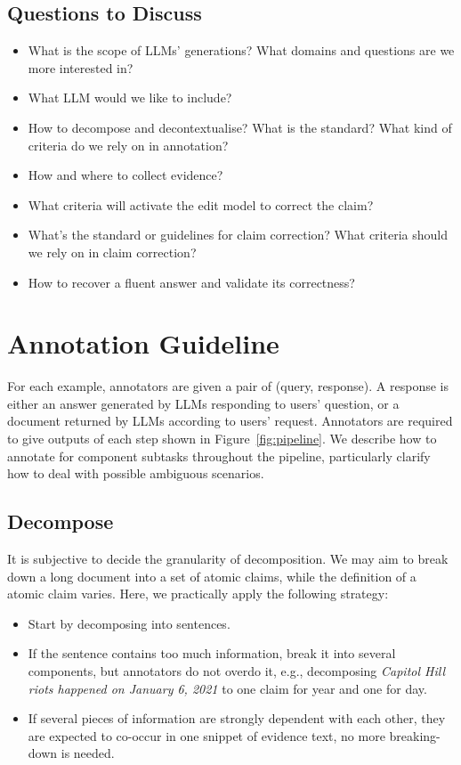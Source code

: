 \documentclass[11pt]{article}
\newcommand{\figref}[1]{Figure~\ref{#1}\xspace}
\begin{document}
\subsection{Questions to Discuss}
\begin{itemize}
    \item What is the scope of LLMs' generations? What domains and questions are we more interested in?
    \item What LLM would we like to include?
    \item How to decompose and decontextualise? What is the standard? What kind of criteria do we rely on in annotation?
    \item How and where to collect evidence?
    \item What criteria will activate the edit model to correct the claim?
    \item What's the standard or guidelines for claim correction? What criteria should we rely on in claim correction?
    \item How to recover a fluent answer and validate its correctness?
\end{itemize}


\section{Annotation Guideline}
For each example, annotators are given a pair of (query, response).
A response is either an answer generated by LLMs responding to users' question, or a document returned by LLMs according to users' request.
Annotators are required to give outputs of each step shown in \figref{fig:pipeline}. 
We describe how to annotate for component subtasks throughout the pipeline, particularly clarify how to deal with possible ambiguous scenarios.

\subsection{Decompose}
It is subjective to decide the granularity of decomposition.
We may aim to break down a long document into a set of atomic claims, while the definition of a atomic claim varies.
Here, we practically apply the following strategy: 
\begin{itemize}
    \item Start by decomposing into sentences.
    \item If the sentence contains too much information, break it into several components, but annotators do not overdo it, e.g., decomposing \textit{Capitol Hill riots happened on January 6, 2021} to one claim for year and one for day. 
    \item If several pieces of information are strongly dependent with each other, they are expected to co-occur in one snippet of evidence text, no more breaking-down is needed.
\end{itemize}
\end{document}
